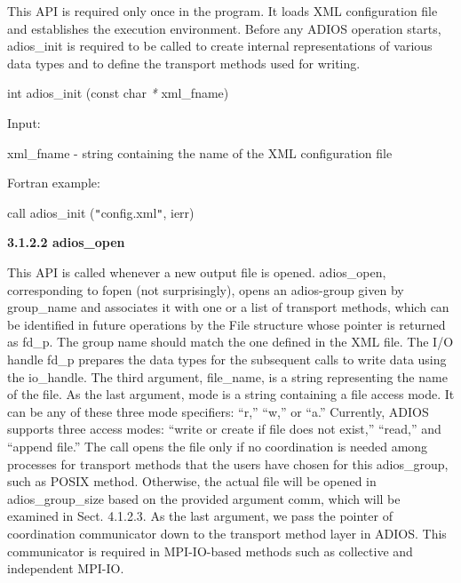 \vspace{10pt}
This API is required only once in the program. It loads XML configuration file 
and establishes the execution environment. Before any ADIOS operation starts, adios\_init 
is required to be called to create internal representations of various data types 
and to define the transport methods used for writing. 

\vspace{10pt}
\leftskip=22pt
int adios\_init (const char  \textit{* }xml\_fname)

\vspace{10pt}
\leftskip=22pt
Input: 

\vspace{10pt}
\leftskip=45pt
xml\_fname - string containing the name of the XML configuration file

\vspace{22pt}
\leftskip=22pt
Fortran example: 

\vspace{10pt}
\parindent=13pt
call adios\_init (\texttt{"}config.xml\texttt{"}, ierr)

\vspace{10pt}
\leftskip=0pt
\parindent=0pt
\textbf{3.1.2.2 adios\_open}

\vspace{10pt}
This API is called whenever a new output file is opened. adios\_open, corresponding 
to fopen (not surprisingly), opens an adios-group given by group\_name\textit{ 
}and associates it with one or a list of transport methods, which can be identified 
in future operations by the File structure whose pointer is returned as\textit{ 
}fd\_p. The group name should match the one defined in the XML file. The I/O handle 
fd\_p prepares the data types for the subsequent calls to write data using the 
io\_handle. The third argument, file\_name, is a string representing the name of 
the file. As the last argument, mode is a string containing a file access mode. 
It can be any of these three mode specifiers: ``r,'' ``w,'' or ``a.'' Currently, 
ADIOS supports three access modes: ``write or create if file does not exist,'' 
``read,'' and ``append file.'' The call opens the file only if no coordination 
is needed among processes for transport methods that the users have chosen for 
this adios\_group, such as POSIX method. Otherwise, the actual file will be opened 
in adios\_group\_size based on the provided argument comm, which will be examined 
in Sect. 4.1.2.3. As the last argument, we pass the pointer of coordination communicator 
down to the transport method layer in ADIOS. This communicator is required in MPI-IO-based 
methods such as collective and independent MPI-IO.


